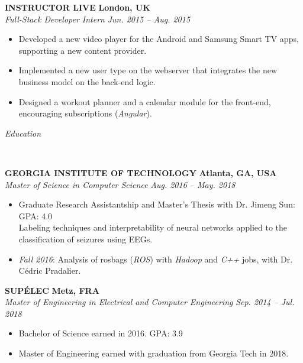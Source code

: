 \documentclass[a4paper, 12pt]{article}
\newcommand{\marginline}{-0.3cm}
\newcommand{\margincontent}{-0.6cm}
\newcommand{\marginbeforesection}{0.35cm}
\newcommand{\linewidthperso}{0.02cm}
\newcommand{\styletitle}[1]{\textbf{#1}}
\newcommand{\styledesc}[1]{\textit{#1}}
\newcommand{\styleloc}[1]{\textbf{#1}}
\newcommand{\styledates}[1]{\textit{#1}}
\newcommand{\stylesection}[1]{
  \vspace{\marginbeforesection}
  \begin{normalsize}\textit{#1}\end{normalsize}
  \vspace{\marginline}\\
  \noindent\makebox[\linewidth]{\rule{\textwidth}{\linewidthperso}}

}
\begin{document}
\begin{footnotesize}
\styletitle{INSTRUCTOR LIVE} \hfill \styleloc{London, UK}\\
\styledesc{Full-Stack Developer Intern} \hfill \styledates{Jun. 2015 -- Aug. 2015}\\
\vspace{\margincontent}
\begin{itemize}
  \item Developed a new video player for the Android and Samsung Smart TV apps, supporting a new content provider.
  \item Implemented a new user type on the webserver that integrates the new business model on the back-end logic.
  \item Designed a workout planner and a calendar module for the front-end, encouraging subscriptions (\textit{Angular}).
\end{itemize}

\stylesection{Education}

\styletitle{GEORGIA INSTITUTE OF TECHNOLOGY} \hfill \styleloc{Atlanta, GA, USA}\\
\styledesc{Master of Science in Computer Science} \hfill \styledates{Aug. 2016 -- May. 2018}\\
\vspace{\margincontent}
\begin{itemize}
  \item Graduate Research Assistantship and Master's Thesis with Dr. Jimeng Sun: \hfill GPA: 4.0\\
  Labeling techniques and interpretability of neural networks applied to the classification of seizures using EEGs.
  \item \textit{Fall 2016}: Analysis of rosbags (\textit{ROS}) with \textit{Hadoop} and \textit{C++} jobs, with Dr. C\'edric Pradalier.
\end{itemize}

\styletitle{SUP\'ELEC} \hfill \styleloc{Metz, FRA}\\
\styledesc{Master of Engineering in Electrical and Computer Engineering} \hfill \styledates{Sep. 2014 -- Jul. 2018}\\
\vspace{\margincontent}
\begin{itemize}
  \item Bachelor of Science earned in 2016. \hfill GPA: 3.9
  \item Master of Engineering earned with graduation from Georgia Tech in 2018.
\end{itemize}


\end{footnotesize}
\end{document}

